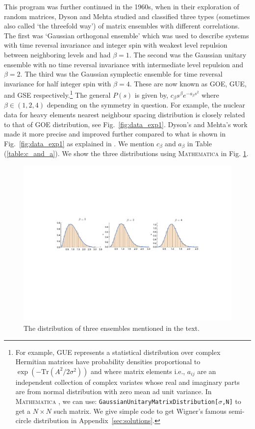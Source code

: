 \documentclass[11pt]{article}
\newcommand{\MA}{\textsc{Mathematica }}
\begin{document}
This program was further continued in the 1960s, when in their exploration of random matrices, 
Dyson and Mehta studied and classified three types (sometimes also called `the threefold way') 
of matrix ensembles with different correlations. The first was `Gaussian orthogonal ensemble' which was used to describe systems with time reversal invariance and integer spin with weakest level repulsion between neighboring levels and had $\beta=1$. The second was the Gaussian unitary ensemble with no time reversal invariance with intermediate level repulsion and $\beta=2$. The third was the Gaussian symplectic ensemble for time reversal invariance for half integer spin with $\beta=4$. These are now known as GOE, GUE, and GSE respectively.\footnote{For example, GUE represents a statistical distribution over complex Hermitian matrices 
have probability densities proportional to $ \exp(-\mbox{Tr}(A^2/2\sigma^2))$ and
where matrix elements i.e., $a_{ij}$ are an independent collection of complex 
variates whose real and imaginary parts are from normal distribution
with zero mean ad unit variance. In \MA, we can use: 
\texttt{GaussianUnitaryMatrixDistribution[$\sigma$,N]}
to get a $N \times N$ such matrix. We give simple code to get Wigner's famous semi-circle
distribution in Appendix~\ref{sec:solutions}.} 
The general $P(s)$ is given by, $c_{\beta}s^{\beta} e^{-a_{\beta}s^2}$ 
where $\beta \in (1,2,4)$ depending on the symmetry in question. 
For example, the nuclear data for heavy elements nearest neighbour spacing distribution
is closely related to that of GOE distribution, see Fig.~\ref{fig:data_exp1}. 
Dyson's and Mehta's work made it more precise and improved further 
compared to what is shown in Fig.~\ref{fig:data_exp1} as explained in 
\cite{PhysRevLett.48.1086}. We mention $c_{\beta}$ and  $a_{\beta}$ in Table (\ref{table:c_and_a}). 
We show the three distributions using \MA in Fig. \ref{fig:ensem1}.  

\begin{figure}[htbp] 
	\centering 
	\includegraphics[width=1.05\textwidth]{figs/ensem.pdf}
	\caption{\label{fig:ensem1}The distribution of three ensembles mentioned in the text.}
\end{figure}
\end{document}
